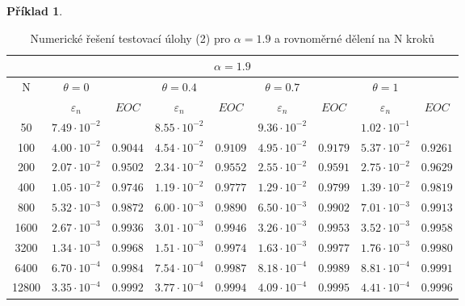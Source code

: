 \documentclass[a4paper,12pt,twoside]{article}
\theoremstyle{definition}
\newtheorem{prikl}[veta]{Příklad}
\theoremstyle{remark}
\numberwithin{equation}{section}
\numberwithin{table}{section}
\numberwithin{figure}{section}
\begin{document}
\begin{prikl}
	\begin{table}[h!]
		\centering
		\caption{Numerické řešení testovací úlohy (2) pro $\alpha = 1.9$ a rovnoměrné dělení na N kroků}
		\label{tab:tabulkaTestovacíÚloha(2),alpha=1.9}
	\begin{tabular}{|c||cc|cc|cc|cc|}
		\hline
		\multicolumn{9}{|c|}{$\alpha = 1.9$} \\
		\hline
		N 	  & $\theta = 0$ & & $\theta = 0.4$ && $\theta = 0.7$ & &$\theta = 1$& \\
		\hline
		& $\varepsilon_{n}$    & $EOC$    & $\varepsilon_{n}$    &$EOC$   & $\varepsilon_{n}$    &$EOC$    &$\varepsilon_{n}$    &$EOC$ \\
		50 	  & $7.49 \cdot 10^{-2}$ & 		    & $8.55 \cdot 10^{-2}$ &		& $9.36 \cdot 10^{-2}$ & 	     &$1.02 \cdot 10^{-1}$& \\
		\hline
		100   & $4.00 \cdot 10^{-2}$ & $0.9044$ & $4.54 \cdot 10^{-2}$ &$0.9109$& $4.95 \cdot 10^{-2}$ &$0.9179$ &$5.37 \cdot 10^{-2}$&$0.9261$ \\
		\hline
		200   & $2.07 \cdot 10^{-2}$ & $0.9502$ & $2.34 \cdot 10^{-2}$ &$0.9552$& $2.55 \cdot 10^{-2}$ &$0.9591$ &$2.75 \cdot 10^{-2}$&$0.9629$\\
		\hline
		400   & $1.05 \cdot 10^{-2}$ & $0.9746$ & $1.19 \cdot 10^{-2}$ &$0.9777$& $1.29 \cdot 10^{-2}$ &$0.9799$ &$1.39 \cdot 10^{-2}$&$0.9819$ \\
		\hline
		800   & $5.32 \cdot 10^{-3}$ & $0.9872$ & $6.00 \cdot 10^{-3}$ &$0.9890$& $6.50 \cdot 10^{-3}$ &$0.9902$ &$7.01 \cdot 10^{-3}$&$0.9913$ \\
		\hline
		1600  & $2.67 \cdot 10^{-3}$ & $0.9936$ & $3.01 \cdot 10^{-3}$ &$0.9946$& $3.26 \cdot 10^{-3}$ &$0.9953$ &$3.52 \cdot 10^{-3}$&$0.9958$ \\
		\hline
		3200  & $1.34 \cdot 10^{-3}$ & $0.9968$ & $1.51 \cdot 10^{-3}$ &$0.9974$& $1.63 \cdot 10^{-3}$ &$0.9977$ &$1.76 \cdot 10^{-3}$&$0.9980$ \\
		\hline
		6400  & $6.70 \cdot 10^{-4}$ & $0.9984$ & $7.54 \cdot 10^{-4}$ &$0.9987$& $8.18 \cdot 10^{-4}$ &$0.9989$ &$8.81 \cdot 10^{-4}$&$0.9991$ \\
		\hline
		12800 & $3.35 \cdot 10^{-4}$ & $0.9992$ & $3.77 \cdot 10^{-4}$ &$0.9994$& $4.09 \cdot 10^{-4}$ &$0.9995$ &$4.41 \cdot 10^{-4}$&$0.9996$ \\
		\hline
	\end{tabular}
	\end{table}
\end{prikl}
\end{document}
